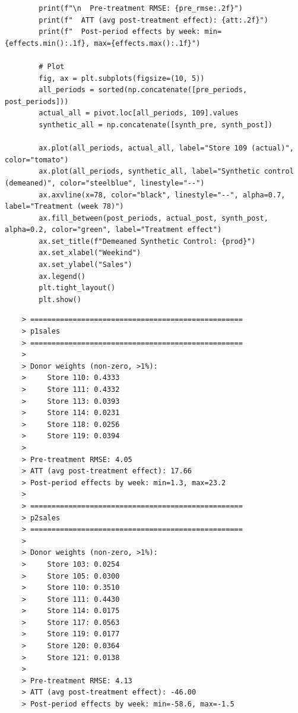 \documentclass[10pt]{article}
\begin{document}
\begin{lstlisting}
        print(f"\n  Pre-treatment RMSE: {pre_rmse:.2f}")
        print(f"  ATT (avg post-treatment effect): {att:.2f}")
        print(f"  Post-period effects by week: min={effects.min():.1f}, max={effects.max():.1f}")

        # Plot
        fig, ax = plt.subplots(figsize=(10, 5))
        all_periods = sorted(np.concatenate([pre_periods, post_periods]))
        actual_all = pivot.loc[all_periods, 109].values
        synthetic_all = np.concatenate([synth_pre, synth_post])
        
        ax.plot(all_periods, actual_all, label="Store 109 (actual)", color="tomato")
        ax.plot(all_periods, synthetic_all, label="Synthetic control (demeaned)", color="steelblue", linestyle="--")
        ax.axvline(x=78, color="black", linestyle="--", alpha=0.7, label="Treatment (week 78)")
        ax.fill_between(post_periods, actual_post, synth_post, alpha=0.2, color="green", label="Treatment effect")
        ax.set_title(f"Demeaned Synthetic Control: {prod}")
        ax.set_xlabel("Weekind")
        ax.set_ylabel("Sales")
        ax.legend()
        plt.tight_layout()
        plt.show()
\end{lstlisting}
\begin{verbatim}
    > ==================================================
    > p1sales
    > ==================================================
    > 
    > Donor weights (non-zero, >1%):
    >     Store 110: 0.4333
    >     Store 111: 0.4332
    >     Store 113: 0.0393
    >     Store 114: 0.0231
    >     Store 118: 0.0256
    >     Store 119: 0.0394
    > 
    > Pre-treatment RMSE: 4.05
    > ATT (avg post-treatment effect): 17.66
    > Post-period effects by week: min=1.3, max=23.2
    > 
    > ==================================================
    > p2sales
    > ==================================================
    > 
    > Donor weights (non-zero, >1%):
    >     Store 103: 0.0254
    >     Store 105: 0.0300
    >     Store 110: 0.3510
    >     Store 111: 0.4430
    >     Store 114: 0.0175
    >     Store 117: 0.0563
    >     Store 119: 0.0177
    >     Store 120: 0.0364
    >     Store 121: 0.0138
    > 
    > Pre-treatment RMSE: 4.13
    > ATT (avg post-treatment effect): -46.00
    > Post-period effects by week: min=-58.6, max=-1.5
\end{verbatim}
\end{document}
